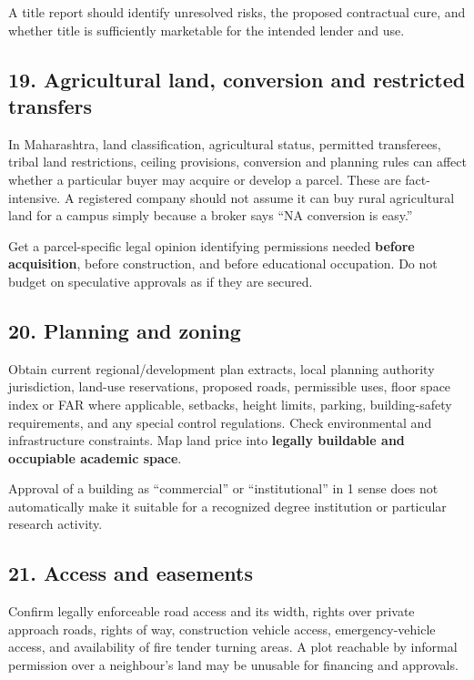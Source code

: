A title report should identify unresolved risks, the proposed contractual cure, and whether title is sufficiently marketable for the intended lender and use.


\subsection{19. Agricultural land, conversion and restricted transfers}

In Maharashtra, land classification, agricultural status, permitted transferees, tribal land restrictions, ceiling provisions, conversion and planning rules can affect whether a particular buyer may acquire or develop a parcel. These are fact-intensive. A registered company should not assume it can buy rural agricultural land for a campus simply because a broker says ``NA conversion is easy.''

Get a parcel-specific legal opinion identifying permissions needed \textbf{before acquisition}, before construction, and before educational occupation. Do not budget on speculative approvals as if they are secured.


\subsection{20. Planning and zoning}

Obtain current regional/development plan extracts, local planning authority jurisdiction, land-use reservations, proposed roads, permissible uses, floor space index or FAR where applicable, setbacks, height limits, parking, building-safety requirements, and any special control regulations. Check environmental and infrastructure constraints. Map land price into \textbf{legally buildable and occupiable academic space}.

Approval of a building as ``commercial'' or ``institutional'' in 1 sense does not automatically make it suitable for a recognized degree institution or particular research activity.


\subsection{21. Access and easements}

Confirm legally enforceable road access and its width, rights over private approach roads, rights of way, construction vehicle access, emergency-vehicle access, and availability of fire tender turning areas. A plot reachable by informal permission over a neighbour's land may be unusable for financing and approvals.

